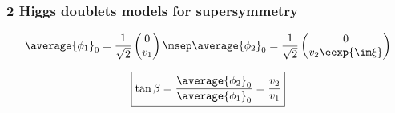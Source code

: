 
\begin{frame}
\frametitle{2 Higgs doublets models for supersymmetry}
\begin{equation*}
\average{\phi_1}_0 = \frac{1}{\sqrt{2}} \begin{pmatrix}
0\\v_1
\end{pmatrix}
\msep
\average{\phi_2}_0 = \frac{1}{\sqrt{2}} \begin{pmatrix}
0\\v_2 \eexp{\im\xi}
\end{pmatrix}
\end{equation*}

\begin{equation*}
\boxed{\tan\beta = \frac{\average{\phi_2}_0}{\average{\phi_1}_0} = \frac{v_2}{v_1}}
\end{equation*}

\end{frame}

%

